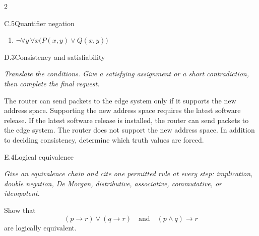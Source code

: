 \documentclass[9pt]{extarticle}
\begin{document}
\begin{multicols}{2}
\begin{CoreProblem}{C.5}{Quantifier negation}
\begin{enumerate}[label=(\alph*)]
  \item $\neg\forall y\,\forall x\bigl(P(x,y)\lor Q(x,y)\bigr)$
\end{enumerate}
\end{CoreProblem}
\columnbreak
\begin{CoreProblem}{D.3}{Consistency and satisfiability}
{\scriptsize\textit{Translate the conditions. Give a satisfying assignment or a short contradiction, then complete the final request.}\par}
The router can send packets to the edge system only if it supports the new
address space. Supporting the new address space requires the latest software
release. If the latest software release is installed, the router can send
packets to the edge system. The router does not support the new address space.
In addition to deciding consistency, determine which truth values are forced.
\end{CoreProblem}
\begin{CoreProblem}{E.4}{Logical equivalence}
{\scriptsize\textit{Give an equivalence chain and cite one permitted rule at every step: implication, double negation, De Morgan, distributive, associative, commutative, or idempotent.}\par}
Show that
\[
  (p\to r)\lor(q\to r)
  \quad\text{and}\quad
  (p\land q)\to r
\]
are logically equivalent.
\end{CoreProblem}
\end{multicols}
\CoreWorkArea
\FormBreak
{}
\end{document}
